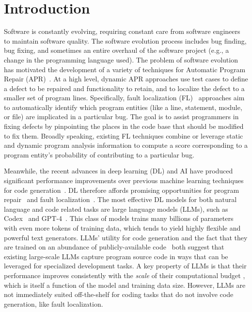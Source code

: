 \documentclass[12pt,openany,oneside,table]{cmuthesis}
\begin{document}
\let\cleardoublepage\clearpage %
\mainmatter


\chapter{Introduction}
\label{ch:intro}

Software is constantly evolving, requiring constant care from software engineers to maintain software quality. The software evolution process includes bug finding, bug fixing, and sometimes an entire overhaul of the software project (e.g., a change in the programming language used).
The problem of software evolution has motivated the development of a variety of
techniques for Automatic Program Repair (APR)~\cite{TBar, long_ml_patch,
patch_learning, claire_apr,patch-sim}. At a high level, dynamic APR approaches
use test cases to define a defect to be repaired and functionality to retain,
and to localize the defect to a smaller set of program lines.
Specifically, fault localization (FL)~\cite{abreu2007accuracy,li2019deepfl,lou2021boosting,li2022fault} approaches aim to automatically identify which program entities (like a line, statement, module, or file) are implicated in a particular bug. The goal is to assist programmers in fixing defects by pinpointing the places in the code base that should be modified to fix them. 
Broadly speaking, existing FL techniques combine or leverage
static and dynamic program analysis information to compute a score corresponding to a program entity's probability of contributing to a particular bug. 

Meanwhile, the recent advances in deep learning (DL) and AI have produced significant performance improvements over
previous machine learning techniques for code generation~\cite{Codex,Neox}. DL therefore
affords promising opportunities for program repair~\cite{long_ml_patch,
patch_learning, Infill_repair,Interfix,Prompt_repair} and fault localization~\cite{Llmao}.
The most effective DL models for both natural language and code related tasks are large language models (LLMs), such as Codex~\cite{chen2021evaluating} and GPT-4~\cite{openai2023gpt4}.
This class of models trains many billions of parameters with even more tokens of training data, which tends to yield highly flexible and powerful text generators.
LLMs' utility for code generation and the fact that they are trained on an abundance of publicly-available code~\cite{chen2021evaluating} both suggest that existing large-scale LLMs capture program source code in ways that can be leveraged for specialized development tasks.
A key property of LLMs is that their performance improves consistently with the \emph{scale} of their computational budget \cite{kaplan2020scaling}, which is itself a function of the model and training data size.
However, LLMs are not immediately suited off-the-shelf for coding tasks that do not involve code generation, like fault localization. 
\end{document}
